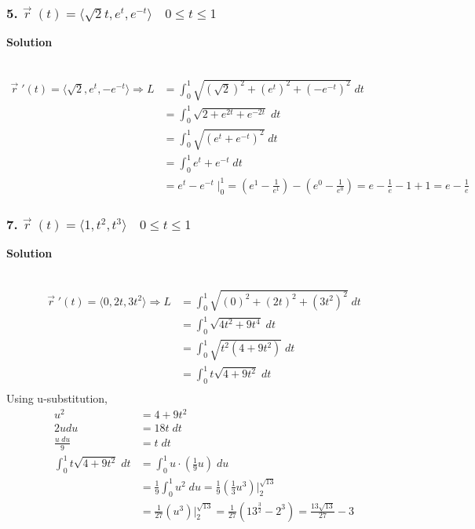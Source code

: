 \documentclass{article}
\begin{document}
\[
\]

\subsubsection*{5. $\vec{r}\;(t) = \langle{\sqrt{2}t, e^{t}, e^{-t}} \rangle \quad 0 \leq t \leq 1$}
\centerline{\textbf{Solution}} \\

\begin{align*}
    \vec{r}\; '(t) = \langle{\sqrt{2}, e^{t}, -e^{-t}} \rangle \Rightarrow
    L &= \int_{0}^{1} \sqrt{(\sqrt{2})^2 + (e^{t})^{2} + (-e^{-t})^{2}}\; dt \\
      &= \int_{0}^{1} \sqrt{2 + e^{2t} + e^{-2t}}\; dt \\ 
      &= \int_{0}^{1} \sqrt{(e^{t} + e^{-t})^2}\; dt \\
      &= \int_{0}^{1} e^{t} + e^{-t}\; dt \\
      &= e^{t} - e^{-t}\; \Big|_{0}^{1} = (e^{1} - \frac{1}{e^1}) - (e^{0} - \frac{1}{e^0}) = e - \frac{1}{e} - 1 + 1 = e - \frac{1}{e}
\end{align*}



\subsubsection*{7. $\vec{r}\;(t) = \langle{1, t^2, t^3} \rangle \quad 0 \leq t \leq 1$}
\centerline{\textbf{Solution}} \\

\begin{align*}
    \vec{r}\; '(t) = \langle{0, 2t, 3t^2} \rangle \Rightarrow
    L &= \int_{0}^{1} \sqrt{(0)^2 + (2t)^2 + (3t^2)^2}\; dt \\
      &= \int_{0}^{1} \sqrt{4t^2 + 9t^4}\; dt \\
      &= \int_{0}^{1} \sqrt{t^2(4 + 9t^2)}\; dt \\
      &= \int_{0}^{1} t\sqrt{4 + 9t^2}\; dt \\
\end{align*}
Using u-substitution,
\begin{align*}
    u^2 &= 4 + 9t^2 \\
    2udu &= 18t\; dt \\
    \frac{u\;du}{9} &= t\; dt \\
    \int_{0}^{1} t\sqrt{4 + 9t^2}\; dt &= \int_{0}^{1} u \cdot(\frac{1}{9} u) \; du \\
                    &= \frac{1}{9} \int_{0}^{1} u^2\; du = \frac{1}{9} (\frac{1}{3} u^3) \Big|_{2}^{\sqrt{13}} \\
                    &= \frac{1}{27} (u^3) \Big|_{2}^{\sqrt{13}} = \frac{1}{27} (13^{\frac{3}{2}} - 2^3) = \frac{13\sqrt{13}}{27} - 3
\end{align*}
\end{document}
